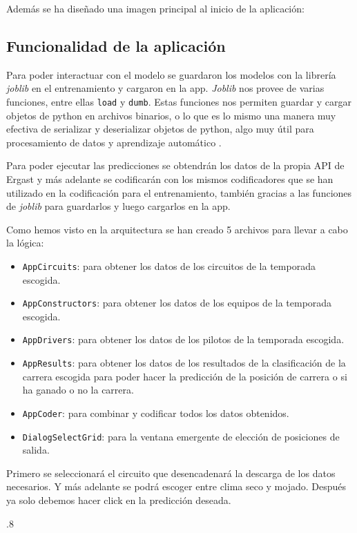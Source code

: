 

Además se ha diseñado una imagen principal al inicio de la aplicación:


\subsection{Funcionalidad de la aplicación}

Para poder interactuar con el modelo se guardaron los modelos con la librería \textit{joblib} en el entrenamiento y cargaron en la app. \textit{Joblib} nos provee de varias funciones, entre ellas \texttt{load} y  \texttt{dumb}. Estas funciones nos permiten guardar y cargar objetos de python en archivos binarios, o lo que es lo mismo una manera muy efectiva de serializar y deserializar objetos de python, algo muy útil para procesamiento de datos y aprendizaje automático \cite{python:joblib}.

Para poder ejecutar las predicciones se obtendrán los datos de la propia API de Ergast y más adelante se codificarán con los mismos codificadores que se han utilizado en la codificación para el entrenamiento, también gracias a las funciones de \textit{joblib} para guardarlos y luego cargarlos en la app. 

Como hemos visto en la arquitectura se han creado 5 archivos para llevar a cabo la lógica:
\begin{itemize}
    \item \texttt{AppCircuits}: para obtener los datos de los circuitos de la temporada escogida.
    \item \texttt{AppConstructors}: para obtener los datos de los equipos de la temporada escogida.
    \item \texttt{AppDrivers}: para obtener los datos de los pilotos de la temporada escogida.
    \item \texttt{AppResults}: para obtener los datos de los resultados de la clasificación de la carrera escogida para poder hacer la predicción de la posición de carrera o si ha ganado o no la carrera.
    \item \texttt{AppCoder}: para combinar y codificar todos los datos obtenidos.
    \item \texttt{DialogSelectGrid}: para la ventana emergente de elección de posiciones de salida.
\end{itemize}

Primero se seleccionará el circuito que desencadenará la descarga de los datos necesarios. Y más adelante se podrá escoger entre clima seco y mojado. Después ya solo debemos hacer click en la predicción deseada. 

{.8}